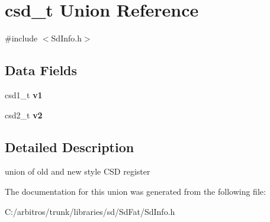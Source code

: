 \hypertarget{unioncsd__t}{\section{csd\-\_\-t Union Reference}
\label{unioncsd__t}
}


{\ttfamily \#include $<$Sd\-Info.\-h$>$}

\subsection*{Data Fields}
\begin{DoxyCompactItemize}
\item 
\hypertarget{unioncsd__t_a83f0a5c54ecca665792b1dde2c5c5325}{csd1\-\_\-t {\bfseries v1}}\label{unioncsd__t_a83f0a5c54ecca665792b1dde2c5c5325}

\item 
\hypertarget{unioncsd__t_ae4e2f6d93a8c0d4607a94f6b2599c62c}{csd2\-\_\-t {\bfseries v2}}\label{unioncsd__t_ae4e2f6d93a8c0d4607a94f6b2599c62c}

\end{DoxyCompactItemize}


\subsection{Detailed Description}
union of old and new style C\-S\-D register 

The documentation for this union was generated from the following file\-:\begin{DoxyCompactItemize}
\item 
C\-:/arbitros/trunk/libraries/sd/\-Sd\-Fat/Sd\-Info.\-h\end{DoxyCompactItemize}
